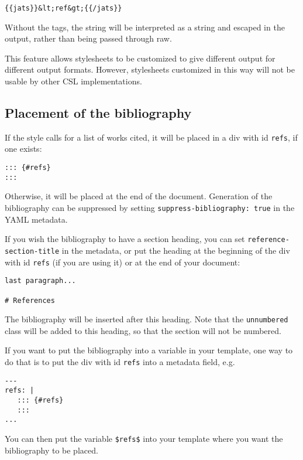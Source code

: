 \begin{verbatim}
{{jats}}&lt;ref&gt;{{/jats}}
\end{verbatim}

Without the tags, the string will be interpreted as a string and escaped
in the output, rather than being passed through raw.

This feature allows stylesheets to be customized to give different
output for different output formats. However, stylesheets customized in
this way will not be usable by other CSL implementations.

\hypertarget{placement-of-the-bibliography}{%
\subsection{Placement of the
bibliography}\label{placement-of-the-bibliography}}

If the style calls for a list of works cited, it will be placed in a div
with id \texttt{refs}, if one exists:

\begin{verbatim}
::: {#refs}
:::
\end{verbatim}

Otherwise, it will be placed at the end of the document. Generation of
the bibliography can be suppressed by setting
\texttt{suppress-bibliography:\ true} in the YAML metadata.

If you wish the bibliography to have a section heading, you can set
\texttt{reference-section-title} in the metadata, or put the heading at
the beginning of the div with id \texttt{refs} (if you are using it) or
at the end of your document:

\begin{verbatim}
last paragraph...

# References
\end{verbatim}

The bibliography will be inserted after this heading. Note that the
\texttt{unnumbered} class will be added to this heading, so that the
section will not be numbered.

If you want to put the bibliography into a variable in your template,
one way to do that is to put the div with id \texttt{refs} into a
metadata field, e.g.

\begin{verbatim}
---
refs: |
   ::: {#refs}
   :::
...
\end{verbatim}

You can then put the variable \texttt{\$refs\$} into your template where
you want the bibliography to be placed.

